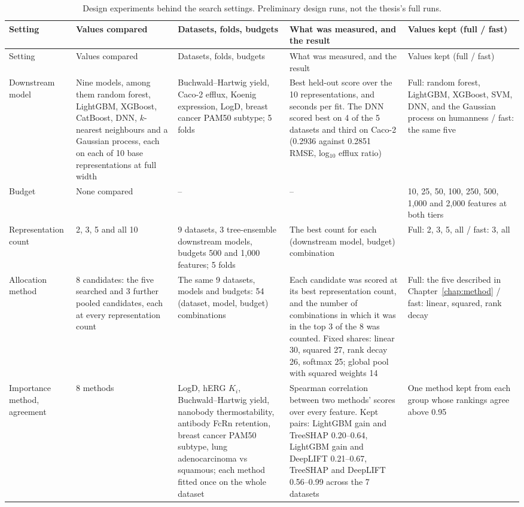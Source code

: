 {\footnotesize
\begin{longtable}{@{}p{1.9cm}p{2.5cm}p{2.7cm}p{4.4cm}p{2.5cm}@{}}
\caption{Design experiments behind the search settings. Preliminary design runs, not the thesis's full runs.}
\label{tab:add:design_experiments}\\
\toprule
Setting & Values compared & Datasets, folds, budgets & What was measured, and the result & Values kept (full / fast) \\
\midrule
\endfirsthead
\toprule
Setting & Values compared & Datasets, folds, budgets & What was measured, and the result & Values kept (full / fast) \\
\midrule
\endhead
Downstream model & Nine models, among them random forest, LightGBM, XGBoost, CatBoost, DNN, $k$-nearest neighbours and a Gaussian process, each on each of 10 base representations at full width & Buchwald--Hartwig yield, Caco-2 efflux, Koenig expression, LogD, breast cancer PAM50 subtype; 5 folds & Best held-out score over the 10 representations, and seconds per fit. The DNN scored best on 4 of the 5 datasets and third on Caco-2 (0.2936 against 0.2851 RMSE, log$_{10}$ efflux ratio) & Full: random forest, LightGBM, XGBoost, SVM, DNN, and the Gaussian process on humanness / fast: the same five \\
\addlinespace
Budget & None compared & -- & -- & 10, 25, 50, 100, 250, 500, 1{,}000 and 2{,}000 features at both tiers \\
\addlinespace
Representation count & 2, 3, 5 and all 10 & 9 datasets, 3 tree-ensemble downstream models, budgets 500 and 1{,}000 features; 5 folds & The best count for each (downstream model, budget) combination & Full: 2, 3, 5, all / fast: 3, all \\
\addlinespace
Allocation method & 8 candidates: the five searched and 3 further pooled candidates, each at every representation count & The same 9 datasets, models and budgets: 54 (dataset, model, budget) combinations & Each candidate was scored at its best representation count, and the number of combinations in which it was in the top 3 of the 8 was counted. Fixed shares: linear 30, squared 27, rank decay 26, softmax 25; global pool with squared weights 14 & Full: the five described in Chapter~\ref{chap:method} / fast: linear, squared, rank decay \\
\addlinespace
Importance method, agreement & 8 methods & LogD, hERG $K_i$, Buchwald--Hartwig yield, nanobody thermostability, antibody FcRn retention, breast cancer PAM50 subtype, lung adenocarcinoma vs squamous; each method fitted once on the whole dataset & Spearman correlation between two methods' scores over every feature. Kept pairs: LightGBM gain and TreeSHAP 0.20--0.64, LightGBM gain and DeepLIFT 0.21--0.67, TreeSHAP and DeepLIFT 0.56--0.99 across the 7 datasets & One method kept from each group whose rankings agree above 0.95 \\

\end{longtable}}
